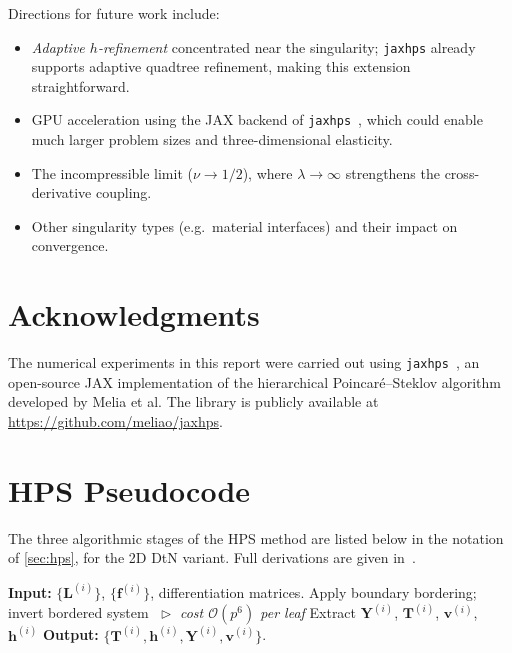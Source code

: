 \documentclass[hidelinks,onefignum,onetabnum]{siamart251216}
\begin{document}
Directions for future work include:
\begin{itemize}
  \item \emph{Adaptive $h$-refinement} concentrated near the singularity;
    \texttt{jaxhps} already supports adaptive quadtree refinement, making this
    extension straightforward.
  \item GPU acceleration using the JAX backend of \texttt{jaxhps}~\cite{melia2025},
    which could enable much larger problem sizes and three-dimensional elasticity.
  \item The incompressible limit ($\nu \to 1/2$), where $\lambda \to \infty$
    strengthens the cross-derivative coupling.
  \item Other singularity types (e.g.\ material interfaces) and their impact on
    convergence.
\end{itemize}

\section*{Acknowledgments}
The numerical experiments in this report were carried out using
\texttt{jaxhps}~\cite{melia2025}, an open-source JAX implementation of the
hierarchical Poincar\'{e}--Steklov algorithm developed by Melia et al.
The library is publicly available at
\url{https://github.com/meliao/jaxhps}.




\appendix

\section{HPS Pseudocode}
\label{sec:appendix}

The three algorithmic stages of the HPS method are listed below in the notation
of \cref{sec:hps}, for the 2D DtN variant.  Full derivations are given
in~\cite{Martinsson2013,melia2025}.

\begin{algorithm}[H]
\caption{Local solve stage}
\label{alg:local}
\begin{algorithmic}[1]\small
  \STATE \textbf{Input:} $\{\mathbf{L}^{(i)}\}$, $\{\mathbf{f}^{(i)}\}$, differentiation matrices.
    \STATE Apply boundary bordering; invert bordered system
           $\;\triangleright$ \emph{cost $\mathcal{O}(p^6)$ per leaf}
    \STATE Extract $\mathbf{Y}^{(i)}$, $\mathbf{T}^{(i)}$, $\mathbf{v}^{(i)}$, $\mathbf{h}^{(i)}$
  \ENDFOR
  \STATE \textbf{Output:} $\{\mathbf{T}^{(i)},\mathbf{h}^{(i)},\mathbf{Y}^{(i)},\mathbf{v}^{(i)}\}$.
\end{algorithmic}
\end{algorithm}
\end{document}
